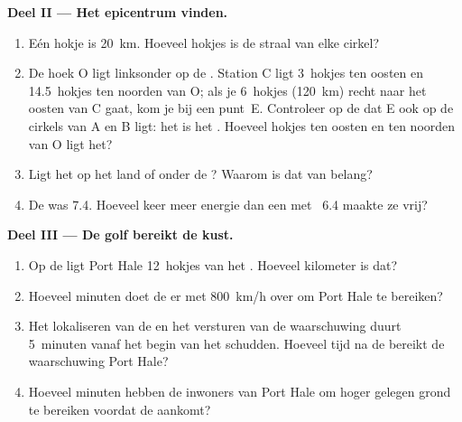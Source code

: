\begin{problem}
\medskip
\noindent\textbf{Deel II --- Het epicentrum vinden.}\par\nopagebreak
\begin{enumerate}[resume, beginpenalty=10000]
  \item Eén hokje is \qty{20}{km}. Hoeveel hokjes is de straal van elke
        cirkel?
  \item De hoek O ligt linksonder op de . Station C ligt 3~hokjes ten
        oosten en 14.5~hokjes ten noorden van O; als je 6~hokjes
        (\qty{120}{km}) recht naar het oosten van C gaat, kom je bij een
        punt~E. Controleer op de  dat E ook op de cirkels van A en B
        ligt: het is het . Hoeveel hokjes ten oosten en ten
        noorden van O ligt het?
  \item Ligt het  op het land of onder de ? Waarom is dat van
        belang?
  \item De  was 7.4. Hoeveel keer meer energie dan een 
        met ~6.4 maakte ze vrij?
\end{enumerate}

\medskip
\noindent\textbf{Deel III --- De golf bereikt de kust.}\par\nopagebreak
\begin{enumerate}[resume, beginpenalty=10000]
  \item Op de  ligt Port Hale 12~hokjes van het . Hoeveel
        kilometer is dat?
  \item Hoeveel minuten doet de  er met \qty{800}{km/h} over om Port
        Hale te bereiken?
  \item Het lokaliseren van de  en het versturen van de
        waarschuwing duurt 5~minuten vanaf het begin van het schudden.
        Hoeveel tijd na de  bereikt de waarschuwing Port Hale?
  \item Hoeveel minuten hebben de inwoners van Port Hale om hoger gelegen
        grond te bereiken voordat de  aankomt?
\end{enumerate}
\end{problem}
